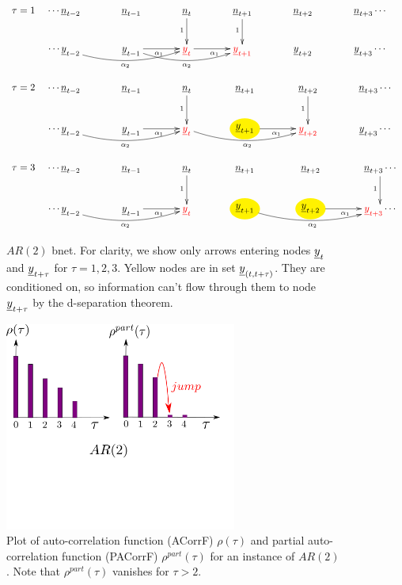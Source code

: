\begin{figure}[h!]
$$
\begin{array}{ll}
\tau=1&
\xymatrix@C=36px{
\cdots
\rvn_{t-2}
&\rvn_{t-1}
&\rvn_t\ar[d]_1
&\rvn_{t+1}\ar[d]_1
&\rvn_{t+2}
&\rvn_{t+3}
\cdots
\\
\cdots
\rvy_{t-2}
\ar@/_1pc/[rr]_{\alp_2}
&\rvy_{t-1}
\ar@/_1pc/[rr]_{\alp_2}
\ar[r]_{\alp_1}
&{\color{red}\rvy_t}
\ar[r]_{\alp_1}
&{\color{red}\rvy_{t+1}}
&\rvy_{t+2}
&\rvy_{t+3}
\cdots
}
\\
\\
\tau=2&
\xymatrix@C=36px{
\cdots
\rvn_{t-2}
&\rvn_{t-1}
&\rvn_t\ar[d]_1
&\rvn_{t+1}
&\rvn_{t+2}\ar[d]_1
&\rvn_{t+3}
\cdots
\\
\cdots
\rvy_{t-2}
\ar@/_1pc/[rr]_{\alp_2}
&\rvy_{t-1}
\ar[r]_{\alp_1}
&{\color{red}\rvy_t}
\ar@/_1pc/[rr]_{\alp_2}
&*++[o][F*:yellow]{\rvy_{t+1}}
\ar[r]_{\alp_1}
&{\color{red}\rvy_{t+2}}
&\rvy_{t+3}
\cdots
}
\\
\\
\tau=3&
\xymatrix@C=36px{
\cdots
\rvn_{t-2}
&\rvn_{t-1}
&\rvn_t\ar[d]_1
&\rvn_{t+1}
&\rvn_{t+2}
&\rvn_{t+3}\ar[d]_1
\cdots
\\
\cdots
\rvy_{t-2}
\ar@/_1pc/[rr]_{\alp_2}
&\rvy_{t-1}
\ar[r]_{\alp_1}
&{\color{red}\rvy_t}
&*++[o][F*:yellow]{\rvy_{t+1}}
\ar@/_1pc/[rr]_{\alp_2}
&*++[o][F*:yellow]{\rvy_{t+2}}
\ar[r]_{\alp_1}
&{\color{red}\rvy_{t+3}}
\cdots
}
\end{array}
$$
\caption{$AR(2)$ bnet.
For clarity, we show only arrows 
entering nodes
${\underline{y}}_t$ and ${\underline{y}}_{t+\tau}$
for $\tau=1,2,3$.
Yellow nodes are
in set ${\underline{y}}_{(t, t+\tau)}$.
They are conditioned on, so 
information can't flow through them
to node ${\underline{y}}_{t+\tau}$
by the d-separation theorem.
}
\label{fig-ar-2-tau-123}
\end{figure}

\begin{figure}[h!]
\centering
\includegraphics[width=3in]
{time-arma/ar-2-ac-pac.png}
\caption{
Plot of auto-correlation function (ACorrF)
$\rho(\tau)$
and partial auto-correlation
function (PACorrF) $\rho^{part}(\tau)$
for an instance
of $AR(2)$. Note
that $\rho^{part}(\tau)$
vanishes for $\tau>2$.
} 
\label{fig-ar-2-ac-pac}
\end{figure}

